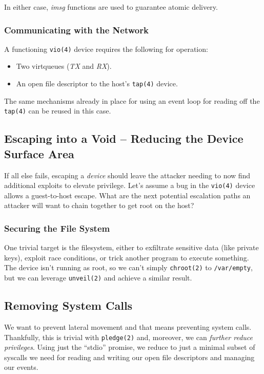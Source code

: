 \documentclass[conference]{IEEEtran}
\begin{document}
In either case, \emph{imsg} functions are used to guarantee atomic
delivery.

\vspace{2mm}
\subsubsection{Communicating with the Network}
A functioning \texttt{vio(4)} device requires the following for
operation:

\vspace{2mm}
\begin{itemize}
  \item Two virtqueues (\emph{TX} and \emph{RX}).
  \item An open file descriptor to the host's \texttt{tap(4)} device.
\end{itemize}
\vspace{2mm}

The same mechanisms already in place for using an event loop for
reading off the \texttt{tap(4)} can be reused in this case.


\vspace{3mm}
\subsection{Escaping into a Void -- Reducing the Device Surface Area}
If all else fails, escaping a \emph{device} should leave the attacker
needing to now find additional exploits to elevate privilege. Let's
assume a bug in the \texttt{vio(4)} device allows a guest-to-host
escape. What are the next potential escalation paths an attacker will
want to chain together to get root on the host?

\vspace{2mm}
\subsubsection{Securing the File System}
One trivial target is the filesystem, either to exfiltrate sensitive
data (like private keys), exploit race conditions, or trick another
program to execute something. The device isn't running as root, so we
can't simply \texttt{chroot(2)} to \texttt{/var/empty}, but we can
leverage \texttt{unveil(2)} and achieve a similar result.

\vspace{2mm}
\subsection{Removing System Calls}
We want to prevent lateral movement and that means preventing system
calls. Thankfully, this is trivial with \texttt{pledge(2)} and,
moreover, we can \emph{further reduce privileges}. Using just the
``stdio'' promise, we reduce to just a minimal subset of syscalls we
need for reading and writing our open file descriptors and managing
our events.
\end{document}
